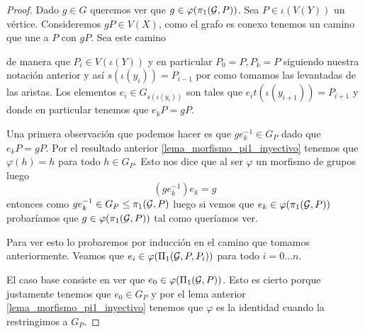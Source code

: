 \documentclass[tesis.tex]{subfiles}
\begin{document}
\begin{proof}
	Dado $g \in G$ queremos ver que $g \in \varphi(\pi_1({\cal G}, P))$.
	Sea $P \in \iota(V(Y))$ un vértice.
	Consideremos $gP \in V(X)$, como el grafo es conexo tenemos un camino que une a $P$ con $gP$. 
	Sea este camino 
	
	\begin{center}
	\end{center}
	


	de manera que $P_i \in V(\iota (Y))$ y en particular $P_0 = P, P_k = P$ siguiendo nuestra notación anterior y así $s(\iota (y_i)) = P_{i-1}$ por como tomamos las levantadas de las aristas.
	Los elementos $e_i \in G_{s(\iota (y_i))}$ son tales que $e_i t(\iota (y_{i+1})) = P_{i+1}$ y donde en particular tenemos que $e_k P = g P$.
	
	Una primera observación que podemos hacer es que $g e_k^{-1} \in G_P$ dado que  $e_k P = g P$.
	Por el resultado anterior \ref{lema_morfismo_pi1_inyectivo} tenemos que $\varphi(h) = h $ para todo $h \in G_P$.
	Esto nos dice que al ser $\varphi$ un morfismo de grupos luego 
	\[
	(ge_k^{-1}) e_k = g
	\]
	entonces como $ge_k^{-1} \in G_P \le \pi_1({\cal G}, P)$ luego si vemos que $e_k \in \varphi(\pi_1({\cal G}, P))$ probaríamos que $g \in \varphi (\pi_1({\cal G},P))$ tal como queríamos ver.
		
	Para ver esto lo probaremos por inducción en el camino que tomamos anteriormente.
	Veamos que $e_i \in \varphi(\Pi_1({\cal G}, P, P_i))$ para todo $i = 0 \dots n$.
	
	El caso base consiste en ver que $e_0 \in \varphi(\Pi_1({\cal G}, P))$.
	Esto es cierto porque justamente tenemos que $e_0 \in G_P$ y por el lema anterior \ref{lema_morfismo_pi1_inyectivo} tenemos que $\varphi$ es la identidad cuando la restringimos a $G_P$.
	

\end{proof}
\end{document}
